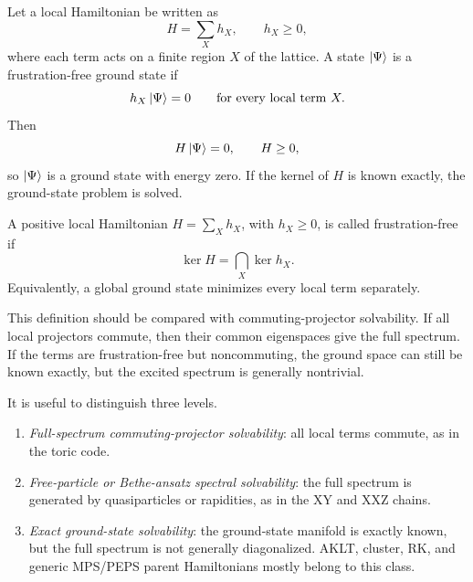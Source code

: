 Let a local Hamiltonian be written as
\begin{equation}
\label{eq:ff-general-hamiltonian}
    H=\sum_X h_X,
    \qquad
    h_X\geq 0,
\end{equation}
where each term acts on a finite region \(X\) of the lattice.  A state
\(\left|\Psi\right\rangle\) is a frustration-free ground state if
\begin{equation}
\label{eq:ff-ground-condition}
    h_X\left|\Psi\right\rangle=0
    \qquad
    \text{for every local term }X.
\end{equation}
Then
\begin{equation}
\label{eq:ff-zero-energy-ground-state}
    H\left|\Psi\right\rangle=0,
    \qquad
    H\geq0,
\end{equation}
so \(\left|\Psi\right\rangle\) is a ground state with energy zero.  If the kernel of
\(H\) is known exactly, the ground-state problem is solved.

\begin{definition}
A positive local Hamiltonian \(H=\sum_X h_X\), with \(h_X\geq0\), is called
frustration-free if
\begin{equation}
\label{eq:ff-kernel-intersection}
    \ker H
    =
    \bigcap_X \ker h_X .
\end{equation}
Equivalently, a global ground state minimizes every local term separately.
\end{definition}

This definition should be compared with commuting-projector solvability.  If all
local projectors commute, then their common eigenspaces give the full spectrum.
If the terms are frustration-free but noncommuting, the ground space can still be
known exactly, but the excited spectrum is generally nontrivial.

\begin{remark}
It is useful to distinguish three levels.
\begin{enumerate}[label=(\alph*)]
    \item \emph{Full-spectrum commuting-projector solvability}: all local terms
    commute, as in the toric code.
    \item \emph{Free-particle or Bethe-ansatz spectral solvability}: the full
    spectrum is generated by quasiparticles or rapidities, as in the XY and XXZ
    chains.
    \item \emph{Exact ground-state solvability}: the ground-state manifold is
    exactly known, but the full spectrum is not generally diagonalized.  AKLT,
    cluster, RK, and generic MPS/PEPS parent Hamiltonians mostly belong to this
    class.
\end{enumerate}
\end{remark}

